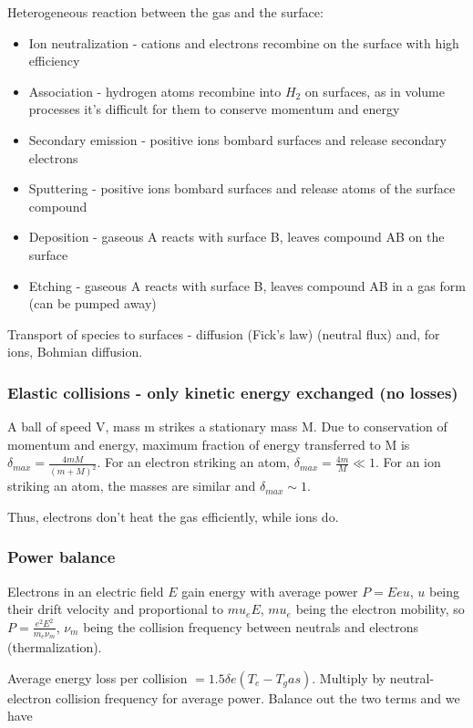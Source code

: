 \documentclass[PlasmaNotes.tex]{subfiles}
\begin{document}
Heterogeneous reaction between the gas and the surface:
\begin{itemize}
\item Ion neutralization - cations and electrons recombine on the surface with high efficiency
\item Association - hydrogen atoms recombine into $H_2$ on surfaces, as in volume processes it's difficult for them to conserve momentum and energy
\item Secondary emission - positive ions bombard surfaces and release secondary electrons
\item Sputtering - positive ions bombard surfaces and release atoms of the surface compound
\item Deposition - gaseous A reacts with surface B, leaves compound AB on the surface
\item Etching - gaseous A reacts with surface B, leaves compound AB in a gas form (can be pumped away)
\end{itemize}

Transport of species to surfaces - diffusion (Fick's law) (neutral flux) and, for ions, Bohmian diffusion.

\subsubsection{Elastic collisions - only kinetic energy exchanged (no losses)}

A ball of speed V, mass m strikes a stationary mass M. Due to conservation of momentum and energy, maximum fraction of energy transferred to M is $\delta_{max} = \frac{4 m M}{(m+M)^2}$. For an electron striking an atom, $\delta_{max} = \frac{4m}{M}\ll 1$. For an ion striking an atom, the masses are similar and $\delta_{max} \sim 1$.

Thus, electrons don't heat the gas efficiently, while ions do.

\subsubsection{Power balance}

Electrons in an electric field $E$ gain energy with average power $P=Eeu$, $u$ being their drift velocity and proportional to $mu_e E$, $mu_e$ being the electron mobility, so $P=\frac{e^2 E^2}{m_e \nu_m}$, $\nu_m$ being the collision frequency between neutrals and electrons (thermalization).

Average energy loss per collision $= 1.5 \delta e (T_e - T_gas)$. Multiply by neutral-electron collision frequency for average power. Balance out the two terms and we have
\end{document}
